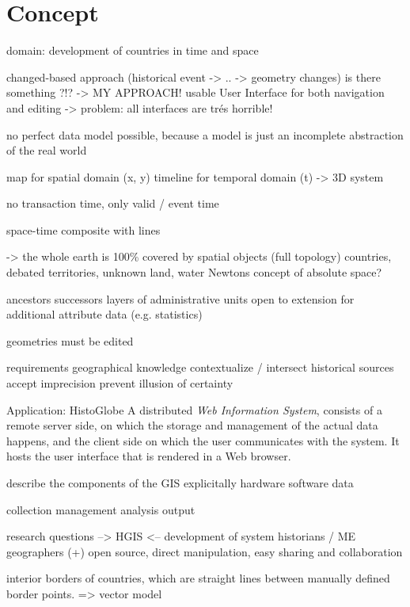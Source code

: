 
\chapter{Concept} %
\label{cha:concept}

domain: development of countries in time and space

changed-based approach (historical event -> .. -> geometry changes)
  is there something ?!?
  -> MY APPROACH!
usable User Interface for both navigation and editing
-> problem: all interfaces are trés horrible!

no perfect data model possible, because a model is just an incomplete abstraction of the real world

map for spatial domain (x, y)
timeline for temporal domain (t)
-> 3D system

no transaction time, only valid / event time

space-time composite with lines

-> the whole earth is 100\% covered by spatial objects (full topology)
  countries, debated territories, unknown land, water
  Newtons concept of absolute space?

ancestors successors
layers of administrative units
open to extension for additional attribute data (e.g. statistics)

geometries must be edited

requirements
  geographical knowledge
  contextualize / intersect historical sources
  accept imprecision
  prevent illusion of certainty


Application: HistoGlobe
A distributed \emph{Web Information System}, consists of a remote server side, on which the storage and management of the actual data happens, and the client side on which the user communicates with the system. It hosts the user interface that is rendered in a Web browser.

describe the components of the GIS explicitally
 hardware
 software
 data

 collection
 management
 analysis
 output


research questions --> HGIS <-- development of system
  historians /                           ME
  geographers
(+) open source, direct manipulation, easy sharing and collaboration

interior borders of countries, which are straight lines between manually defined border points.
=> vector model

